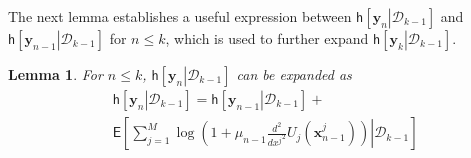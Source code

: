 \documentclass[10pt,twocolumn,twoside]{IEEEtran}
\newtheorem{lemma}{Lemma}
\begin{document}
The next lemma establishes a useful expression between ${\ensuremath{\mathsf{h}\left[\left.{{\ensuremath{\boldsymbol{{y}}}}_n}\right|{\mathcal{D}_{k-1}}\right]}}$ and ${\ensuremath{\mathsf{h}\left[\left.{{\ensuremath{\boldsymbol{{y}}}}_{n-1}}\right|{\mathcal{D}_{k-1}}\right]}}$ for $n\leq k$, which is used to further expand ${\ensuremath{\mathsf{h}\left[\left.{{\ensuremath{\boldsymbol{{y}}}}_k}\right|{\mathcal{D}_{k-1}}\right]}}$.

\begin{lemma}\label{Lem: Entropy-Equality}
For $n\leq k$, ${\ensuremath{\mathsf{h}\left[\left.{{\ensuremath{\boldsymbol{{y}}}}_n}\right|{\mathcal{D}_{k-1}}\right]}}$ can be expanded as
\begin{align}
&{\ensuremath{\mathsf{h}\left[\left.{{\ensuremath{\boldsymbol{{y}}}}_{n}}\right|{\mathcal{D}_{k-1}}\right]}}={\ensuremath{\mathsf{h}\left[\left.{{\ensuremath{\boldsymbol{{y}}}}_{n-1}}\right|{\mathcal{D}_{k-1}}\right]}}+\nonumber\\
&\mathsf{E}\left[\sum_{j=1}^M\log\left(1+\mu_{n-1}\left.\frac{d ^2}{d {x^j}^2}U_{j}\left({\ensuremath{\boldsymbol{{x}}}}^{j}_{n-1}\!\right)\right)\right|\mathcal{D}_{k-1}\right]
\end{align}
\end{lemma}
\end{document}

